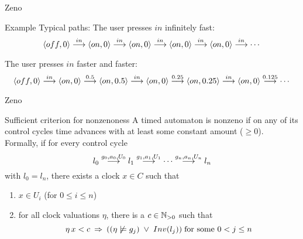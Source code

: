 \documentclass{beamer}
\def\dgold#1{{\darkgoldenrod #1}}
\def\dkb#1{{\blue #1}}
\begin{document}
\begin{slide}{Zeno}
\small


\begin{block}{Example}
\dgold{Typical paths:}
The user presses $in$ \dgold{infinitely fast}:
\begin{equation*}
\mathopen{\langle}off,0\mathclose{\rangle}  \stackrel{in}{\longrightarrow}  \mathopen{\langle}on,0\mathclose{\rangle}  \stackrel{in}{\longrightarrow}  \mathopen{\langle}on,0\mathclose{\rangle}  \stackrel{in}{\longrightarrow}  \mathopen{\langle}on,0\mathclose{\rangle}  \stackrel{in}{\longrightarrow}  \mathopen{\langle}on,0\mathclose{\rangle}  \stackrel{in}{\longrightarrow} \cdots
\end{equation*}


The user presses $in$ \dgold{faster and faster}:
\begin{equation*}
\mathopen{\langle}off,0\mathclose{\rangle}  \stackrel{in}{\longrightarrow}   \mathopen{\langle}on,0\mathclose{\rangle}  \stackrel{0.5}{\longrightarrow} \mathopen{\langle}on,0.5\mathclose{\rangle} \stackrel{in}{\longrightarrow} \mathopen{\langle}on,0\mathclose{\rangle} \stackrel{0.25}{\longrightarrow}  \mathopen{\langle}on,0.25\mathclose{\rangle}   \stackrel{in}{\longrightarrow} \mathopen{\langle}on,0\mathclose{\rangle}  \stackrel{0.125}{\longrightarrow}  \cdots
\end{equation*}
\end{block}


\end{slide}


\begin{slide}{Zeno}
\small


\begin{block}{Sufficient criterion for nonzenoness}
A timed automaton is nonzeno if on any of its control cycles time advances with at least some  
\dkb{constant amount} ($\geq 0$). Formally, if for every control cycle
\begin{equation*}
l_0 \stackrel{g_0, a_0, U_0}{\longrightarrow} l_1 \stackrel{g_1, a_1, U_1}{\longrightarrow} \cdots  \stackrel{g_n, a_n, U_n}{\longrightarrow} l_n 
\end{equation*}
with $l_0=l_n$,  there exists a clock $x \in C$ such that
\begin{enumerate}
\item  $x \in U_i$ (for $0 \leq i \leq n$)
\item for all clock valuations $\eta$, there is a  $c \in \mathbb{N}_{>0}$ such that
\begin{equation*}
\eta\, x < c\; \mathbin{\Rightarrow}\; ((\eta \not\models g_j)\; \mathbin{\vee}\; Inv(l_j)) \; \text{for some $0 < j \leq n$}
\end{equation*}
\end{enumerate}


\end{block}

\end{slide}
\end{document}
